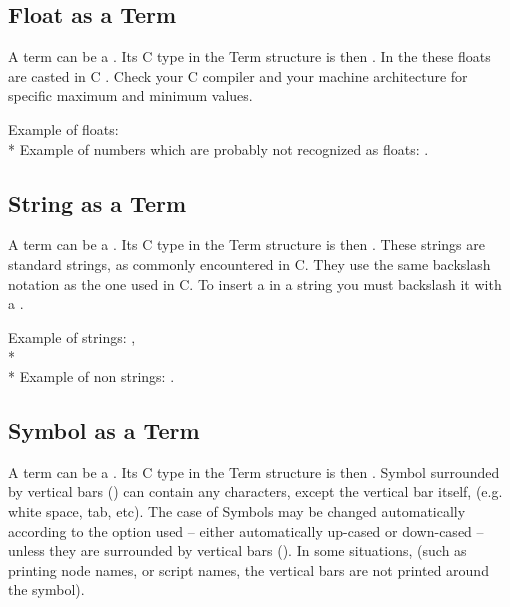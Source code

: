 \subsection{Float as a Term}

A term can be a . Its C type in the Term structure is
then . In the \CPK{} these floats are casted in C
. Check your C compiler and your machine architecture for
specific maximum and minimum values.

Example of floats:  \\* 
Example of numbers which are probably not recognized as floats: .

\subsection{String as a Term}

A term can be a . Its C type in the Term structure is then
. These strings are standard strings, as commonly encountered in
C. They use the same backslash notation as the one used in C. To insert a
 in a string you must backslash it with a \samp{\textbackslash}.

Example of strings: , \\*
 \\*
Example of non strings: .

\subsection{Symbol as a Term}


A term can be a . Its C type in the Term structure is then
. Symbol surrounded by vertical bars (\samp{|}) can
contain any characters, except the vertical bar itself, (e.g. white
space, tab, etc). The case of Symbols may be changed automatically
according to the option used -- either automatically up-cased or
down-cased -- unless they are surrounded by vertical bars
(\samp{|}). In some situations, (such as printing node names, or
script names, the vertical bars are not printed around the symbol).

